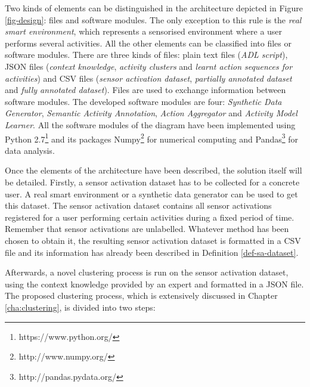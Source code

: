 Two kinds of elements can be distinguished in the architecture depicted in Figure \ref{fig-design}: files and software modules. The only exception to this rule is the \textit{real smart environment}, which represents a sensorised environment where a user performs several activities. All the other elements can be classified into files or software modules. There are three kinds of files: plain text files (\textit{ADL script}), JSON files (\textit{context knowledge}, \textit{activity clusters} and \textit{learnt action sequences for activities}) and CSV files (\textit{sensor activation dataset}, \textit{partially annotated dataset} and \textit{fully annotated dataset}). Files are used to exchange information between software modules. The developed software modules are four: \textit{Synthetic Data Generator}, \textit{Semantic Activity Annotation}, \textit{Action Aggregator} and \textit{Activity Model Learner}. All the software modules of the diagram have been implemented using Python 2.7\footnote{https://www.python.org/} and its packages Numpy\footnote{http://www.numpy.org/} for numerical computing and Pandas\footnote{http://pandas.pydata.org/} for data analysis. 

Once the elements of the architecture have been described, the solution itself will be detailed. Firstly, a sensor activation dataset has to be collected for a concrete user. A real smart environment or a synthetic data generator can be used to get this dataset. The sensor activation dataset contains all sensor activations registered for a user performing certain activities during a fixed period of time. Remember that sensor activations are unlabelled. Whatever method has been chosen to obtain it, the resulting sensor activation dataset is formatted in a CSV file and its information has already been described in Definition \ref{def-sa-dataset}.

Afterwards, a novel clustering process is run on the sensor activation dataset, using the context knowledge provided by an expert and formatted in a JSON file. The proposed clustering process, which is extensively discussed in Chapter \ref{cha:clustering}, is divided into two steps: 

